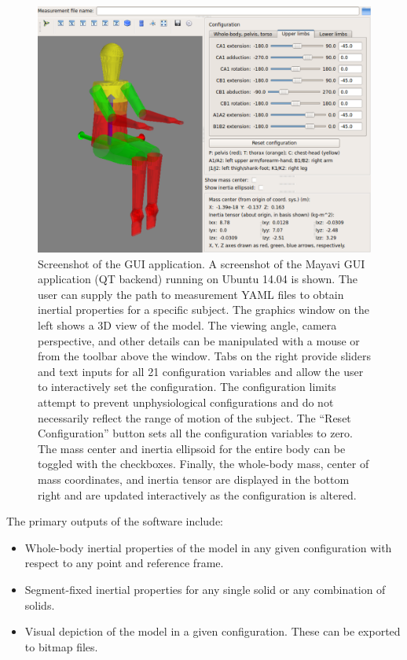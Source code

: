 \documentclass[10pt,a4paper,twocolumn]{article}
\begin{document}
\begin{figure}
  \begin{center}
    \includegraphics{figures/gui-screenshot.png}
  \end{center}
  \caption{
    Screenshot of the GUI application. A screenshot of the Mayavi GUI
    application (QT backend) running on Ubuntu 14.04 is shown. The user can
    supply the path to measurement YAML files to obtain inertial properties for
    a specific subject. The graphics window on the left shows a 3D view of the
    model. The viewing angle, camera perspective, and other details can be
    manipulated with a mouse or from the toolbar above the window. Tabs on the
    right provide sliders and text inputs for all 21 configuration variables
    and allow the user to interactively set the configuration. 
    The configuration limits attempt to prevent unphysiological configurations 
    and do not necessarily reflect the range of motion of the subject.
    The ``Reset Configuration'' button sets all
    the configuration variables to zero. The mass center and inertia ellipsoid
    for the entire body can be toggled with the checkboxes. Finally, the
    whole-body mass, center of mass coordinates, and inertia tensor are
    displayed in the bottom right and are updated interactively as the
    configuration is altered.
  }
  \label{fig:gui}
\end{figure}

The primary outputs of the software include:

\begin{itemize}
  \item Whole-body inertial properties of the model in any given configuration
    with respect to any point and reference frame.
  \item Segment-fixed inertial properties for any single solid or any
    combination of solids.
  \item Visual depiction of the model in a given configuration. These can be
    exported to bitmap files.
\end{itemize}
\end{document}
